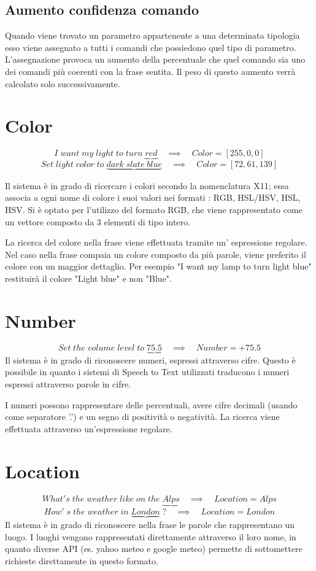 \documentclass[twoside]{supsistudent}
\begin{document}
\subsection{Aumento confidenza comando}
Quando viene trovato un parametro appartenente a una determinata tipologia esso viene assegnato a tutti i comandi che possiedono quel tipo di parametro. L'assegnazione provoca un aumento della percentuale che quel comando sia uno dei comandi più coerenti con la frase sentita. Il peso di questo aumento verrà calcolato solo successivamente.
\section{Color}
\begin{center}
\[
I\;want\;my\;light\;to\;turn\;
\underbrace{red}
\quad\implies\quad Color = [255,0,0]
\]
\[
Set\;light\;color\;to\;
\underbrace{dark\;slate\;blue}
\quad\implies\quad Color = [72,61,139]
\]
\end{center}

Il sistema è in grado di ricercare i colori secondo la nomenclatura X11; essa associa a ogni nome di colore i suoi valori nei formati : RGB, HSL/HSV, HSL, HSV. Si è optato per l'utilizzo del formato RGB, che viene rappresentato come un vettore composto da 3 elementi di tipo intero.\cite{x11Colors}

La ricerca del colore nella frase viene effettuata tramite un' espressione regolare. Nel caso nella frase compaia un colore composto da più parole, viene preferito il colore con un maggior dettaglio.
Per esempio "I want my lamp to turn light blue" restituirà il colore "Light blue" e non "Blue".
\section{Number}
\[
Set\;the\;volume\;level\;to\;
\underbrace{75.5}
\quad\implies\quad Number = +75.5
\]
Il sistema è in grado di riconoscere numeri, espressi attraverso cifre. Questo è possibile in quanto i sistemi di Speech to Text utilizzati traducono i numeri espressi attraverso parole in cifre.

I numeri possono rappresentare delle percentuali, avere cifre decimali (usando come separatore '.') e un segno di positività o negatività. La ricerca viene effettuata attraverso un'espressione regolare.
\section{Location}
\[
What's\;the\;weather\;like\;on\;the\;
\underbrace{Alps}
\quad\implies\quad Location = Alps
\]
\[
How'\;s\;the\;weather\;in\;
\underbrace{London}\;?
\quad\implies\quad Location = London
\]
Il sistema è in grado di riconoscere nella frase le parole che rappresentano un luogo.
I luoghi vengono rappresentati direttamente attraverso il loro nome, in quanto diverse API (es. yahoo meteo e google meteo) permette di sottomettere richieste direttamente in questo formato.
\end{document}
